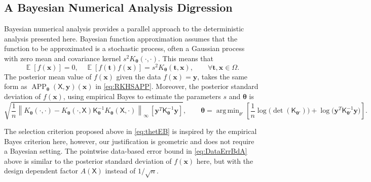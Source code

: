 \documentclass[]{mcom-l}
\theoremstyle{theorem}
\theoremstyle{remark}
\DeclareMathOperator*{\argmin}{arg\,min}
\DeclareMathOperator{\APP}{APP}
\DeclareMathOperator{\Ex}{\mathbb{E}}
\newcommand{\mK}{\mathsf{K}}
\newcommand{\mX}{\mathsf{X}}
\newcommand{\bx}{{\boldsymbol{x}}}
\newcommand{\by}{{\boldsymbol{y}}}
\newcommand{\bt}{{\boldsymbol{t}}}
\newcommand{\btheta}{{\boldsymbol{\theta}}}
\newcommand{\cx}{{\Omega}}
\newcommand{\norm}[2][{}]{\ensuremath{\left \lVert #2 \right \rVert}_{#1}}
\begin{document}
\subsection{A Bayesian Numerical Analysis Digression} \label{sec:Bayes}

Bayesian numerical analysis \cite{Dia88a,RasWil06a,Ste99} provides a parallel approach to the deterministic analysis presented here.  Bayesian function approximation assumes that the function to be approximated is a stochastic process, often a Gaussian process with zero mean and covariance kernel $s^2 K_\btheta(\cdot, \cdot)$.  This means that 
\begin{equation*}
\Ex[f(\bx)] = 0, \quad \Ex[f(\bt) f(\bx)] = s^2K_\btheta(\bt,\bx), \qquad \forall \bt, \bx \in \cx.
\end{equation*}
The posterior mean value of $f(\bx)$ given the data $f(\bx) = \by$, takes the same form as $\APP_\btheta(\mX,\by)(\bx)$ in \eqref{eq:RKHSAPP}.  Moreover, the posterior standard deviation of $f(\bx)$, using empirical Bayes to estimate the parameters $s$ and $\btheta$ is \cite{Hic17a,??}
\begin{equation*}
\sqrt{\frac 1n \norm[\infty]{K_\btheta(\cdot,\cdot) - K_\btheta(\cdot,\mX) \mK_\btheta^{-1} K_\btheta(\mX,\cdot)} \, [\by^T \mK_\btheta^{-1} \by] }, \qquad \btheta = \argmin_{\theta'}  \left[\frac 1n \log \bigl( \det(\mK_{\btheta'}) \bigr) + \log \bigl ( \by^T \mK_{\btheta'}^{-1} \by \bigr)\right].
\end{equation*}

The selection criterion proposed above in \eqref{eq:thetEB} is inspired by the empirical Bayes criterion here, however, our justification is geometric and does not require a Bayesian setting.  The pointwise data-based error bound in \eqref{eq:DataErrBdA} above is similar to the posterior standard deviation of $f(\bx)$ here, but with the design dependent factor $A(\mX)$ instead of $1/\sqrt{n}$.






\end{document}
